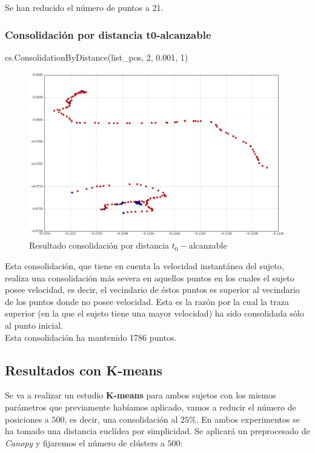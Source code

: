 \documentclass[a4paper, 12pt]{article}
\begin{document}
Se han reducido el n\'umero de puntos a 21.\\

\subsubsection{Consolidaci\'on por distancia t0-alcanzable}

\begin{python}
cs.ConsolidationByDistance(list_pos, 2, 0.001, 1)
\end{python}

\begin{figure}[H]
	\includegraphics[scale=.45]{../comparativa/t0Sujet1.png}
	\caption{Resultado consolidaci\'on por distancia $t_0-$alcanzable}
\end{figure}

Esta consolidaci\'on, que tiene en cuenta la velocidad instant\'anea del sujeto, realiza una consolidaci\'on m\'as severa en aquellos puntos en los cuales el sujeto posee velocidad, es decir, el vecindario de \'estos puntos es superior al vecindario de los puntos donde no posee velocidad. Esta es la raz\'on por la cual la traza superior (en la que el sujeto tiene una mayor velocidad) ha sido consolidada s\'olo al punto inicial. \\

Esta consolidaci\'on ha mantenido 1786 puntos.\\

\pagebreak
\subsection{Resultados con K-means}

Se va a realizar un estudio \textbf{K-means} para ambos sujetos con los mismos par\'ametros que previamente hab\'iamos aplicado, vamos a reducir el n\'umero de posiciones a $500$, es decir, una consolidaci\'on al $25\%$. En ambos experimentos se ha tomado una distancia eucl\'idea por simplicidad. Se aplicar\'a un preprocesado de \textit{Canopy} y fijaremos el n\'umero de cl\'usters a $500$: \\
\end{document}
